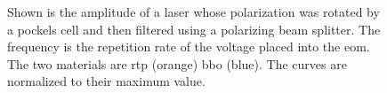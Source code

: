 \begin{figure}[t]
\label{fig:eom_amp_time}
\caption{Shown is the amplitude of a laser whose polarization was rotated by a pockels cell and then filtered using a polarizing beam splitter. The frequency is the repetition rate of the voltage placed into the \ac{eom}. The two materials are \ac{rtp} (orange) \ac{bbo} (blue). The curves are normalized to their maximum value.}
\end{figure}

